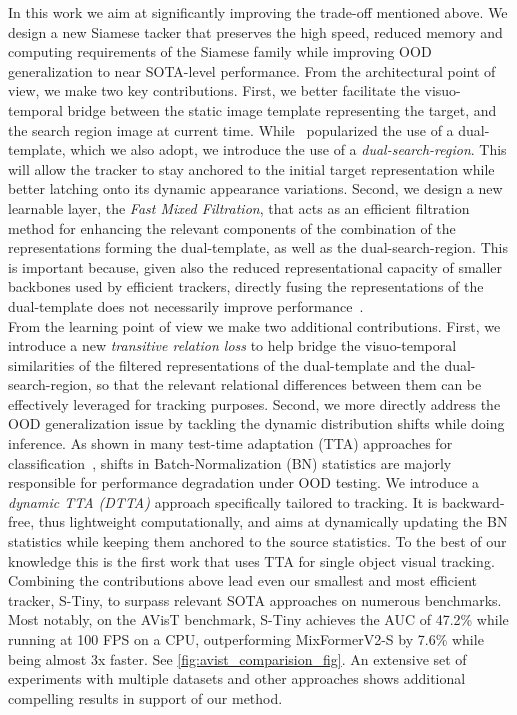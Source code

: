 In this work we aim at significantly improving the trade-off mentioned above. We design a new Siamese tacker that preserves the high speed, reduced memory and computing requirements of the Siamese family while improving OOD generalization to near SOTA-level performance. From the architectural point of view, we make two key contributions. First, we better facilitate the visuo-temporal bridge between the static image template representing the target, and the search region image at current time. While~\cite{borsuk2022fear} popularized the use of a dual-template, which we also adopt, we introduce the use of a \emph{dual-search-region}. This will allow the tracker to stay anchored to the initial target representation while better latching onto its dynamic appearance variations. Second, we design a new learnable layer, the \emph{Fast Mixed Filtration}, that acts as an efficient filtration method for enhancing the relevant components of the combination of the representations forming the dual-template, as well as the dual-search-region. This is important because, given also the reduced representational capacity of smaller backbones used by efficient trackers, directly fusing the representations of the dual-template does not necessarily improve performance~\cite{borsuk2022fear}.\\


From the learning point of view we make two additional contributions. First, we introduce a new \emph{transitive relation loss} to help bridge the visuo-temporal similarities of the filtered representations of the dual-template and the dual-search-region, so that the relevant relational differences between them can be effectively leveraged for tracking purposes. Second, we more directly address the OOD generalization issue by tackling the dynamic distribution shifts while doing inference. As shown in many test-time adaptation (TTA) approaches for classification~\cite{wang2020tent,mirza2022norm, pan2018two, niu2022efficient, schneider2020improving, li2016revisiting}, shifts in Batch-Normalization (BN) statistics are majorly responsible for performance degradation under OOD testing. We introduce a \emph{dynamic TTA (DTTA)} approach specifically tailored to tracking. It is backward-free, thus lightweight computationally, and aims at dynamically updating the BN statistics while keeping them anchored to the source statistics. To the best of our knowledge this is the first work that uses TTA for single object visual tracking.\\


Combining the contributions above lead even our smallest and most efficient tracker, S-Tiny, to surpass relevant SOTA approaches on numerous benchmarks. Most notably, on the AVisT benchmark, S-Tiny achieves the AUC of 47.2\% while running at 100 FPS on a CPU, outperforming MixFormerV2-S by 7.6\% while being almost 3x faster. See \ref{fig:avist_comparision_fig}. An extensive set of experiments with multiple datasets and other approaches shows additional compelling results in support of our method.